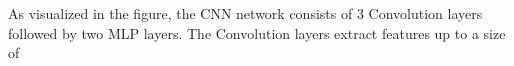 \documentclass[../main.tex]{subfiles}
\begin{document}
As visualized in the figure, the CNN network consists of 3 Convolution layers followed by two MLP layers.
The Convolution layers extract features up to a size of 



%
\end{document}
